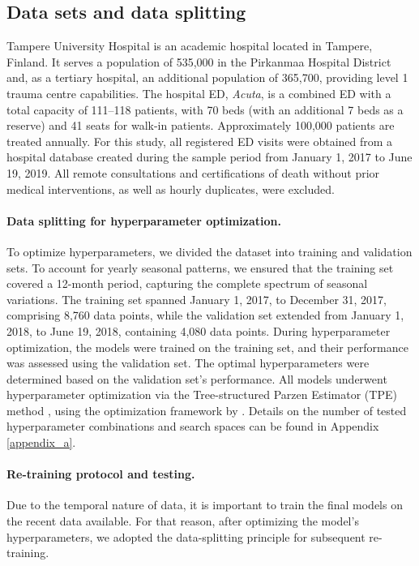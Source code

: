 \subsection{Data sets and data splitting}\label{subsec:data}

Tampere University Hospital is an academic hospital located in Tampere, Finland. It serves a population of 535,000 in the Pirkanmaa Hospital District and, as a tertiary hospital, an additional population of 365,700, providing level 1 trauma centre capabilities. The hospital ED, \emph{Acuta}, is a combined ED with a total capacity of 111–118 patients, with 70 beds (with an additional 7 beds as a reserve) and 41 seats for walk-in patients. Approximately 100,000 patients are treated annually. For this study, all registered ED visits were obtained from a hospital database created during the sample period from January 1, 2017 to June 19, 2019. All remote consultations and certifications of death without prior medical interventions, as well as hourly duplicates, were excluded.


\paragraph{Data splitting for hyperparameter optimization.} 
To optimize hyperparameters, we divided the dataset into training and validation sets. To account for yearly seasonal patterns, we ensured that the training set covered a 12-month period, capturing the complete spectrum of seasonal variations. The training set spanned January 1, 2017, to December 31, 2017, comprising 8,760 data points, while the validation set extended from January 1, 2018, to June 19, 2018, containing 4,080 data points. During hyperparameter optimization, the models were trained on the training set, and their performance was assessed using the validation set. The optimal hyperparameters were determined based on the validation set's performance. All models underwent hyperparameter optimization via the Tree-structured Parzen Estimator (TPE) method \cite{Bergstra2011}, using the optimization framework by \citet{Akiba2019}. Details on the number of tested hyperparameter combinations and search spaces can be found in Appendix \ref{appendix_a}.


\paragraph{Re-training protocol and testing.} 
Due to the temporal nature of data, it is important to train the final models on the recent data available. For that reason, after optimizing the model's hyperparameters, we adopted the data-splitting principle for subsequent re-training. 

